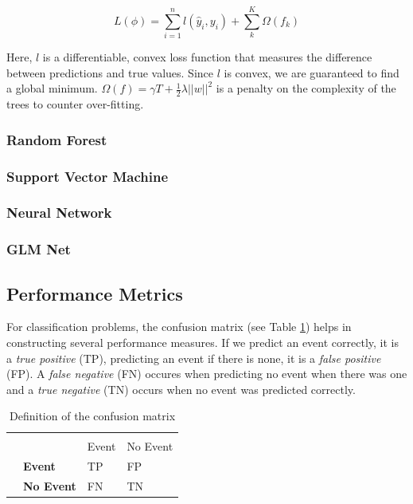 \documentclass[
  11pt,
  a4paper,
  DIV=12,captions=tableheading,oneside]{scrbook}
\begin{document}
\begin{equation}
L(\phi) = \sum_{i=1}^n l(\hat{y}_i, y_i) + \sum_k^K \Omega(f_k)
\label{eq:gbm-loss}
\end{equation}

Here, \(l\) is a differentiable, convex loss function that measures the difference between predictions and true values. Since \(l\) is convex, we are guaranteed to find a global minimum. \(\Omega(f) = \gamma T + \frac{1}{2}\lambda||w||^2\) is a penalty on the complexity of the trees to counter over-fitting.

\hypertarget{random-forest}{%
\subsubsection{Random Forest}\label{random-forest}}

\hypertarget{support-vector-machine}{%
\subsubsection{Support Vector Machine}\label{support-vector-machine}}

\hypertarget{neural-network}{%
\subsubsection{Neural Network}\label{neural-network}}

\hypertarget{glm-net}{%
\subsubsection{GLM Net}\label{glm-net}}

\hypertarget{performance-metrics}{%
\subsection{Performance Metrics}\label{performance-metrics}}

For classification problems, the confusion matrix (see Table \ref{tab:conf-matrix-def}) helps in constructing several performance measures. If we predict an event correctly, it is a \emph{true positive} (TP), predicting an event if there is none, it is a \emph{false positive} (FP). A \emph{false negative} (FN) occures when predicting no event when there was one and a \emph{true negative} (TN) occurs when no event was predicted correctly.

\begin{table}[!h]

\caption{\label{tab:conf-matrix-def}Definition of the confusion matrix}
\centering
\begin{tabular}{>{\bfseries}l>{\bfseries}lll}
\toprule
\multicolumn{2}{c}{ } & \multicolumn{2}{c}{True value} \\
\cmidrule(l{3pt}r{3pt}){3-4}
  &   & Event & No Event\\
\midrule
 & Event & TP & FP\\
\cmidrule{2-4}
\multirow{-2}{*}{\raggedright\arraybackslash Predicted} & No Event & FN & TN\\
\bottomrule
\end{tabular}
\end{table}
\end{document}
